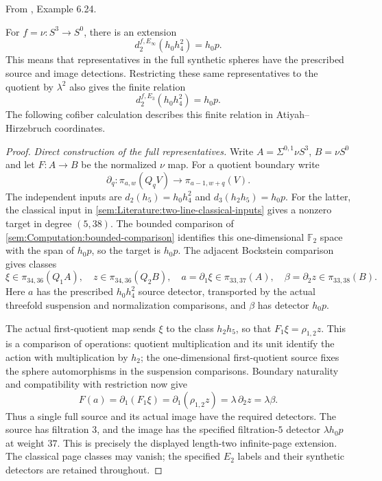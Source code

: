 \begin{proposition}
\label{paper:6.24}
\label{exam:stretchext}
From \cite{LWX126}, Example 6.24.\par
For $f=\nu:S^3\to S^0$, there is an extension
\[
d_2^{f,E_\infty}(h_0h_4^2)=h_0p.
\]
This means that representatives in the full synthetic spheres have the
prescribed source and image detections. Restricting these same
representatives to the quotient by $\lambda^2$ also gives the finite
relation
\[
d_2^{f,E_3}(h_0h_4^2)=h_0p.
\]
The following cofiber calculation describes this finite relation in
Atiyah--Hirzebruch coordinates.
\end{proposition}
\begin{proof}
\textit{Direct construction of the full representatives.}
Write $A=\Sigma^{0,1}\nu S^3$, $B=\nu S^0$ and let
$F:A\to B$ be the normalized $\nu$ map. For a quotient
boundary write
\[
\partial_q:\pi_{a,w}(Q_qV)\longrightarrow\pi_{a-1,w+q}(V).
\]
The independent inputs are $d_2(h_5)=h_0h_4^2$ and
$d_3(h_2h_5)=h_0p$. For the latter, the classical input in
\ref{sem:Literature:two-line-classical-inputs} gives a nonzero target
in degree $(5,38)$. The bounded comparison of
\ref{sem:Computation:bounded-comparison} identifies this one-dimensional
$\mathbb F_2$ space with the span of $h_0p$, so the target is $h_0p$.
The adjacent Bockstein comparison gives classes
\[
\xi\in\pi_{34,36}(Q_1A),\quad
z\in\pi_{34,36}(Q_2B),\quad
a=\partial_1\xi\in\pi_{33,37}(A),\quad
\beta=\partial_2z\in\pi_{33,38}(B).
\]
Here $a$ has the prescribed $h_0h_4^2$ source detector, transported by
the actual threefold suspension and normalization comparisons, and
$\beta$ has detector $h_0p$.

The actual first-quotient map sends $\xi$ to the class $h_2h_5$,
so that $F_1\xi=\rho_{1,2}z$. This is a comparison of operations:
quotient multiplication and its unit identify the action with
multiplication by $h_2$; the one-dimensional first-quotient source
fixes the sphere automorphisms in the suspension comparisons.
Boundary naturality and compatibility with restriction now give
\[
F(a)=\partial_1(F_1\xi)
     =\partial_1(\rho_{1,2}z)
     =\lambda\,\partial_2z=\lambda\beta.
\]
Thus a single full source and its actual image have the required
detectors. The source has filtration $3$, and the image has the
specified filtration-$5$ detector $\lambda h_0p$ at weight $37$.
This is precisely the displayed length-two infinite-page extension.
The classical page classes may vanish; the specified $E_2$ labels
and their synthetic detectors are retained throughout.


\end{proof}
